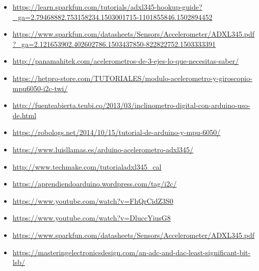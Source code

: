 \documentclass[10pt, a4paper, twocolumn]{article} %
\begin{document}
\begin{itemize}

\item \url{https://learn.sparkfun.com/tutorials/adxl345-hookup-guide?_ga=2.79468882.753158234.1503001715-1101855846.1502894452}
\item \url{https://www.sparkfun.com/datasheets/Sensors/Accelerometer/ADXL345.pdf?_ga=2.121653902.402602786.1503437850-822822752.1503333391}
\item \url{http://panamahitek.com/acelerometros-de-3-ejes-lo-que-necesitas-saber/}
\item \url{https://hetpro-store.com/TUTORIALES/modulo-acelerometro-y-giroscopio-mpu6050-i2c-twi/}
\item \url{http://fuenteabierta.teubi.co/2013/03/inclinometro-digital-con-arduino-uso-de.html}
\item \url{https://robologs.net/2014/10/15/tutorial-de-arduino-y-mpu-6050/}
\item \url{https://www.luisllamas.es/arduino-acelerometro-adxl345/}
\item \url{http://www.techmake.com/tutorialadxl345_cal}
\item \url{https://aprendiendoarduino.wordpress.com/tag/i2c/}
\item \url{https://www.youtube.com/watch?v=FhQrCidZ3S0}
\item \url{https://www.youtube.com/watch?v=DluccYiusG8}
\item \url{https://www.sparkfun.com/datasheets/Sensors/Accelerometer/ADXL345.pdf}
\item \url{https://masteringelectronicsdesign.com/an-adc-and-dac-least-significant-bit-lsb/}

\end{itemize}






\end{document}
